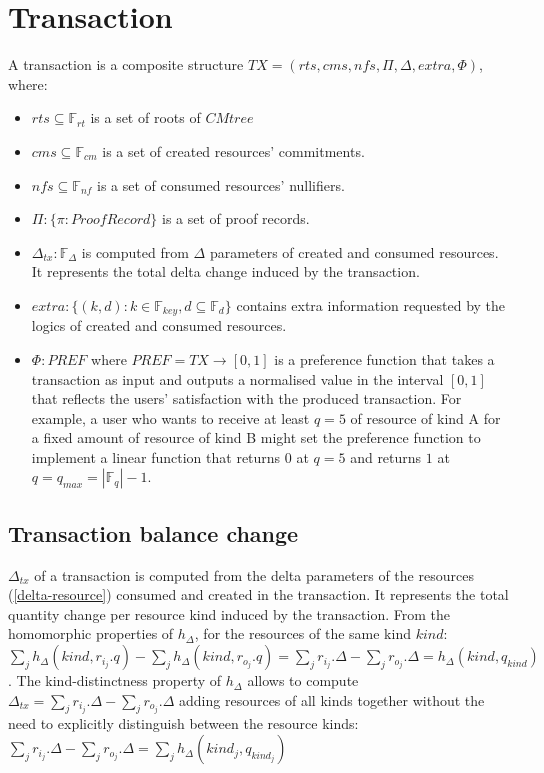 \documentclass[
    11pt,            %
    techreport,        %
    affiltop,       %
]{art}
\begin{document}
\section{Transaction}

A transaction is a composite structure $TX = (rts, cms, nfs, \Pi, \Delta, extra, \Phi)$, where:
\begin{itemize}
    \item $rts \subseteq \mathbb{F}_{rt}$ is a set of roots of $CMtree$
    \item $cms \subseteq  \mathbb{F}_{cm}$ is a set of created resources' commitments. 
    \item $nfs \subseteq \mathbb{F}_{nf}$ is a set of consumed resources' nullifiers.
    \item $\Pi: \{ \pi: ProofRecord\}$ is a set of proof records.
    \item $\Delta_{tx}: \mathbb{F}_{\Delta}$ is computed from $\Delta$ parameters of created and consumed resources. It represents the total delta change induced by the transaction.
    \item $extra: \{(k, d): k \in \mathbb{F}_{key}, d \subseteq \mathbb{F}_{d}\}$ contains extra information requested by the logics of created and consumed resources.
    \item $\Phi: PREF$ where $PREF = TX \rightarrow [0, 1]$ is a preference function that takes a transaction as input and outputs a normalised value in the interval $[0,1]$ that reflects the users' satisfaction with the produced transaction. For example, a user who wants to receive at least $q=5$ of resource of kind A for a fixed amount of resource of kind B might set the preference function to implement a linear function that returns $0$ at $q=5$ and returns $1$ at $q = q_{max} = |\mathbb{F}_q| - 1$.
\end{itemize}

\subsection{Transaction balance change}

$\Delta_{tx}$ of a transaction is computed from the delta parameters of the resources (\ref{delta-resource}) consumed and created in the transaction. It represents the total quantity change per resource kind induced by the transaction. From the homomorphic properties of $h_\Delta$, for the resources of the same kind $kind$: $\sum_j{h_\Delta(kind, r_{i_j}.q)} - \sum_j{h_\Delta(kind, r_{o_j}.q)} = \sum_j{r_{i_j}.\Delta} - \sum_j{r_{o_j}.\Delta} =  h_\Delta(kind, q_{kind})$. The kind-distinctness property of $h_\Delta$ allows to compute $\Delta_{tx} = \sum_j{r_{i_j}.\Delta} - \sum_j{r_{o_j}.\Delta}$ adding resources of all kinds together without the need to explicitly distinguish between the resource kinds: $\sum_j{r_{i_j}.\Delta} - \sum_j{r_{o_j}.\Delta} = \sum_j{h_\Delta(kind_j, q_{kind_j})}$
\end{document}
